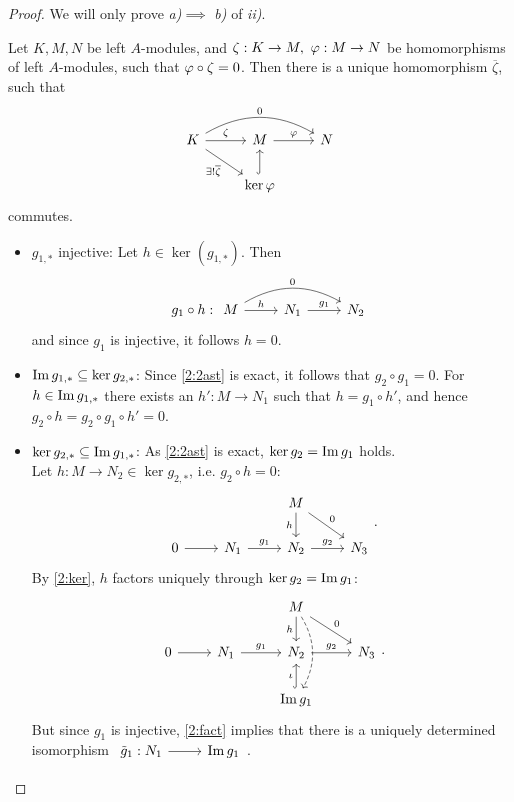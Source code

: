   \begin{proof}
    We will only prove \textit{a)}$\implies$ \textit{b)} of \textit{ii)}.
    \color{purple}
    \begin{lem}\label{2:ker}
      Let $K,M,N$ be left $A$-modules, and $\zeta: K\to M,~\varphi:M\to N$ be homomorphisms of left $A$-modules, such that $\varphi\circ \zeta= 0$. Then there is a unique homomorphism $\overline{\zeta}$, such that
      \[
      \begin{tikzcd}
        K\ar{r}{\zeta}\ar[swap]{rd}{\exists!\overline{\zeta}}\ar[bend left]{rr}{0}&M\ar{r}{\pphi}&N\\
        &\ker\pphi \ar[hookrightarrow]{u}&
      \end{tikzcd}
      \] commutes.
    \end{lem}
    \color{black}
    \begin{itemize}
      \item $g_{1,\ast}$ injective: Let $h\in \ker (g_{1,\ast})$. Then
      \[
      g_1\circ h: \begin{tikzcd} M\ar[bend left]{rr}{0}\ar{r}{h}&N_1\ar{r}{g_1}&N_2\end{tikzcd}
      \]
      and since $g_1$ is injective, it follows $h=0$.
      \item $\operatorname{Im} g_{1,\ast}\subseteq \ker g_{2,\ast}$: Since \ref{2:2ast} is exact, it follows that $g_2\circ g_1=0$. For $h\in \operatorname{Im} g_{1,\ast}$ there exists an $h':M\to N_1$ such that $h=g_1\circ h'$, and hence $g_2\circ h = g_2\circ g_1\circ h' = 0$.
      \item $\ker g_{2,\ast}\subseteq \operatorname{Im} g_{1,\ast}$: As \eqref{2:2ast} is exact, $\ker g_2=\operatorname{Im} g_1$ holds.\\
      Let $h:M\to N_2\in\ker g_{2,\ast}$, i.e. $g_2\circ h=0$:
      \[
      \begin{tikzcd}
        &&M\ar[swap]{d}{h}\ar{rd}{0}&\\
        0\ar{r}&N_1\ar{r}{g_1}&N_2\ar{r}{g_2}&N_3
      \end{tikzcd}.
      \]
      By \cref{2:ker}, $h$ factors uniquely through $\ker g_2=\operatorname{Im} g_1$:
      \[
      \begin{tikzcd}
        &&M\ar[swap]{d}{h}\ar{rd}{0}\ar[bend left,dashed]{dd}&\\
        0\ar{r}&N_1\ar{r}{g_1}&N_2\ar{r}{g_2}&N_3\\
        &&\im g_1\ar[hookrightarrow]{u}{\iota}&
      \end{tikzcd}.
      \]
      But since $g_1$ is injective, \eqref{2:fact} implies that there is a uniquely determined isomorphism $\begin{tikzcd}\tilde{g}_1:N_1\ar{r}&\im g_1\end{tikzcd}$.\\

\end{itemize}
\end{proof}
